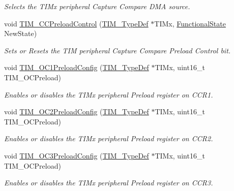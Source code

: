 \begin{DoxyCompactItemize}
\begin{DoxyCompactList}\small\item\em Selects the T\+I\+Mx peripheral Capture Compare D\+MA source. \end{DoxyCompactList}\item 
void \mbox{\hyperlink{group___t_i_m___private___functions_ga0a935254e44312b1d78e8684a58db3c1}{T\+I\+M\+\_\+\+C\+C\+Preload\+Control}} (\mbox{\hyperlink{struct_t_i_m___type_def}{T\+I\+M\+\_\+\+Type\+Def}} $\ast$T\+I\+Mx, \mbox{\hyperlink{group___exported__types_gac9a7e9a35d2513ec15c3b537aaa4fba1}{Functional\+State}} New\+State)
\begin{DoxyCompactList}\small\item\em Sets or Resets the T\+IM peripheral Capture Compare Preload Control bit. \end{DoxyCompactList}\item 
void \mbox{\hyperlink{group___t_i_m___private___functions_ga60e6c29ad8f919bef616cf8e3306dd64}{T\+I\+M\+\_\+\+O\+C1\+Preload\+Config}} (\mbox{\hyperlink{struct_t_i_m___type_def}{T\+I\+M\+\_\+\+Type\+Def}} $\ast$T\+I\+Mx, uint16\+\_\+t T\+I\+M\+\_\+\+O\+C\+Preload)
\begin{DoxyCompactList}\small\item\em Enables or disables the T\+I\+Mx peripheral Preload register on C\+C\+R1. \end{DoxyCompactList}\item 
void \mbox{\hyperlink{group___t_i_m___private___functions_ga75b4614c6dd2cd52f2c5becdb6590c10}{T\+I\+M\+\_\+\+O\+C2\+Preload\+Config}} (\mbox{\hyperlink{struct_t_i_m___type_def}{T\+I\+M\+\_\+\+Type\+Def}} $\ast$T\+I\+Mx, uint16\+\_\+t T\+I\+M\+\_\+\+O\+C\+Preload)
\begin{DoxyCompactList}\small\item\em Enables or disables the T\+I\+Mx peripheral Preload register on C\+C\+R2. \end{DoxyCompactList}\item 
void \mbox{\hyperlink{group___t_i_m___private___functions_ga8b2391685a519e60e596b7d596f86f09}{T\+I\+M\+\_\+\+O\+C3\+Preload\+Config}} (\mbox{\hyperlink{struct_t_i_m___type_def}{T\+I\+M\+\_\+\+Type\+Def}} $\ast$T\+I\+Mx, uint16\+\_\+t T\+I\+M\+\_\+\+O\+C\+Preload)
\begin{DoxyCompactList}\small\item\em Enables or disables the T\+I\+Mx peripheral Preload register on C\+C\+R3. \end{DoxyCompactList}\item 

\end{DoxyCompactItemize}
